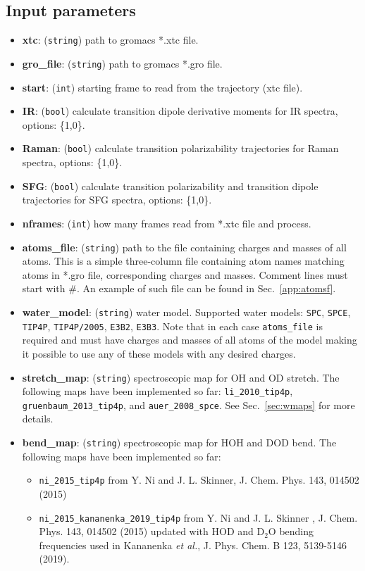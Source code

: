 \documentclass{article}
\begin{document}
\subsection{Input parameters}

\begin{itemize}

\item \textbf{xtc}: (\texttt{string}) path to gromacs *.xtc file.
\item \textbf{gro\_file}: (\texttt{string}) path to gromacs *.gro file.
\item \textbf{start}: (\texttt{int}) starting frame to read from the trajectory (xtc file).
\item \textbf{IR}: (\texttt{bool}) calculate transition dipole derivative moments for IR spectra, options: \{1,0\}.
\item \textbf{Raman}: (\texttt{bool}) calculate transition polarizability trajectories for Raman spectra, options: \{1,0\}.
\item \textbf{SFG}: (\texttt{bool}) calculate transition polarizability and transition dipole trajectories for SFG spectra, options: \{1,0\}.
\item \textbf{nframes}: (\texttt{int}) how many frames read from *.xtc file and process.
\item \textbf{atoms\_file}: (\texttt{string}) path to the file containing charges and masses of all atoms. This is a simple three-column file containing atom names matching atoms in 
*.gro file, corresponding charges and masses. Comment lines must start with \textsc{\#}. An example of such file can be found in Sec.~\ref{app:atomsf}.
\item \textbf{water\_model}: (\texttt{string}) water model. Supported water models: \texttt{SPC}, \texttt{SPCE}, \texttt{TIP4P}, \texttt{TIP4P/2005}, \texttt{E3B2}, \texttt{E3B3}.
Note that in each case \texttt{atoms\_file} is required and must have charges and masses of all atoms of the model making it possible to use any of these models
with any desired charges.
\item \textbf{stretch\_map}: (\texttt{string}) spectroscopic map for OH and OD stretch. The following maps have been implemented so far:
 \texttt{li\_2010\_tip4p},  \texttt{gruenbaum\_2013\_tip4p}, and \texttt{auer\_2008\_spce}. See Sec.~\ref{sec:wmaps} for more details.

\item \textbf{bend\_map}: (\texttt{string}) spectroscopic map for HOH and DOD bend. 
The following maps have been implemented so far:
\begin{itemize}
\item \texttt{ni\_2015\_tip4p} from Y. Ni and J. L. Skinner, J. Chem. Phys. 143, 014502 (2015)
\item  \texttt{ni\_2015\_kananenka\_2019\_tip4p} from Y. Ni and J. L. Skinner , J. Chem. Phys. 143, 014502 (2015) updated with HOD and D$_2$O 
bending frequencies used in Kananenka \textit{et al.}, J. Phys. Chem. B 123, 5139-5146 (2019).
\end{itemize}



\end{itemize}
\end{document}

